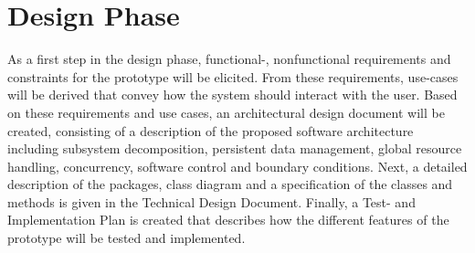 \section{Design Phase}
As a first step in the design phase, functional-, nonfunctional requirements and constraints for the prototype will be elicited. From these requirements, use-cases will be derived that convey how the system should interact with the user. Based on these requirements and use cases, an architectural design document will be created, consisting of a description of the proposed software architecture including subsystem decomposition, persistent data management, global resource handling, concurrency, software control and boundary conditions. Next, a detailed description of the packages, class diagram and a specification of the classes and methods is given in the Technical Design Document. Finally, a Test- and Implementation Plan is created that describes how the different features of the prototype will be tested and implemented.


